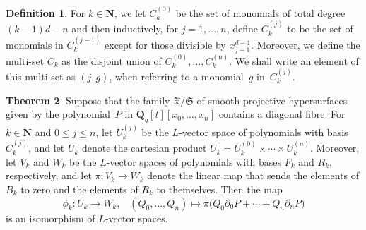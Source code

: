 \documentclass[a4paper,11pt]{article}
\numberwithin{equation}{section}
\newcommand{\NN}{\mathbf{N}} %
\newcommand{\QQ}{\mathbf{Q}} %
\renewcommand{\to}{\rightarrow}        %
\theoremstyle{definition}
\newtheorem{thm}{Theorem}[section]
\newtheorem{defn}[thm]{Definition}
\begin{document}
\begin{defn} \label{defn:IndexSets}
For $k \in \NN$, we let $C_k^{(0)}$ be the set of monomials of total 
degree $(k-1)d - n$ and then inductively, for $j = 1, \dotsc, n$, define 
$C_k^{(j)}$ to be the set of monomials in $C_k^{(j-1)}$ except for those 
divisible by $x_{j-1}^{d-1}$.  Moreover, we define the multi-set $C_k$ as 
the disjoint union of $C_k^{(0)}, \dotsc, C_k^{(n)}$.  We shall write an 
element of this multi-set as $(j, g)$, when referring to a monomial~$g$ 
in~$C_k^{(j)}$.
\end{defn}

\begin{thm} \label{thm:Isomorphism}
Suppose that the family $\mathfrak{X}/\mathfrak{S}$ of smooth projective
hypersurfaces given by the polynomial~$P$ in $\QQ_q[t][x_0, \dotsc, x_n]$ contains 
a diagonal fibre.  For $k \in \NN$ and $0 \leq j \leq n$, let $U_k^{(j)}$ be 
the $L$-vector space of polynomials with basis $C_k^{(j)}$, and let $U_k$ 
denote the cartesian product $U_k = U_k^{(0)} \times \dotsb \times U_k^{(n)}$. 
Moreover, let $V_k$ and $W_k$ be the $L$-vector spaces of polynomials with 
bases $F_k$ and $R_k$, respectively, and let $\pi \colon V_k \rightarrow W_k$ 
denote the linear map that sends the elements of $B_k$ to zero and the 
elements of $R_k$ to themselves. %
Then the map 
\begin{equation}
\phi_k \colon U_k \to W_k, \; \; \;
(Q_0, \dotsc, Q_n) \mapsto \pi \bigl( Q_0 \partial_0 P + \dotsb + Q_n \partial_n P \bigr)
\end{equation}
is an isomorphism of $L$-vector spaces.
\end{thm}
\end{document}
